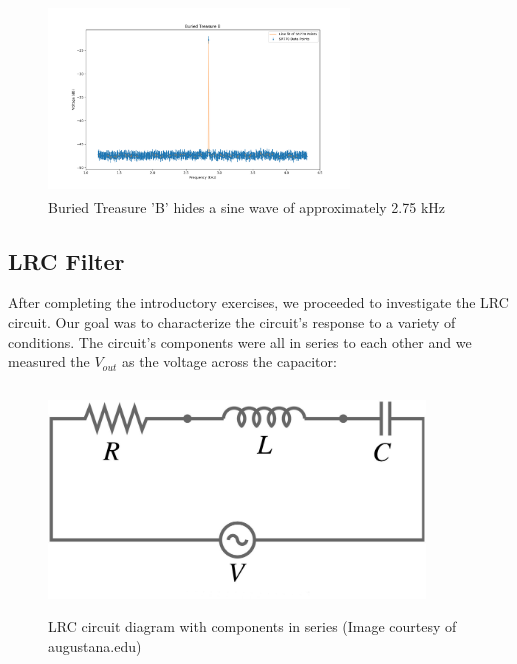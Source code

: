 \documentclass{article}
\begin{document}
\begin{figure}[H]
    \centering
\begin{minipage}{11cm}
\begin{tcolorbox}
    \centering
        \includegraphics[width=8cm, height=5cm]{figures/figure17.png}
        \caption{Buried Treasure 'B' hides a sine wave of approximately 2.75 kHz}
        \label{fig:fig17}
\end{tcolorbox}
\end{minipage}
\end{figure}

\subsection{LRC Filter}%
\label{sub:lrc_filter}

After completing the introductory exercises, we proceeded to investigate the
LRC circuit. Our goal was to characterize the circuit's response to a variety
of conditions. The circuit's components were all in series to each other and we
measured the $V_{out}$ as the voltage across the capacitor:

\begin{figure}[H]
    \centering
\begin{minipage}{11cm}
\begin{tcolorbox}
    \centering
        \includegraphics[width=10cm, height=6cm]{figures/figure18.png}
        \caption{LRC circuit diagram with components in series (Image courtesy
        of augustana.edu)}
        \label{fig:fig18}
\end{tcolorbox}
\end{minipage}
\end{figure}
\end{document}
